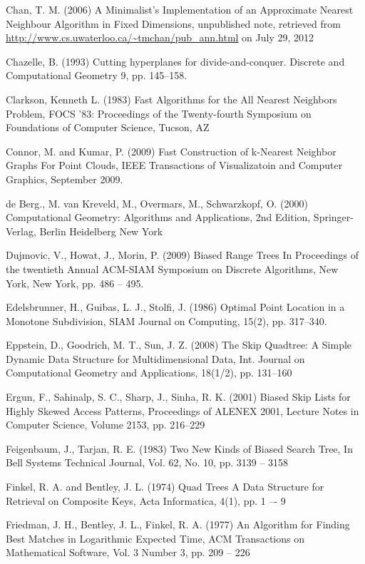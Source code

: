 \documentclass[mcs]{scsthesis}
\begin{document}
\begin{thebibliography}{5}
Chan, T. M. (2006) A Minimalist's Implementation of an Approximate Nearest
Neighbour Algorithm in Fixed Dimensions, unpublished note, retrieved from
\url{http://www.cs.uwaterloo.ca/~tmchan/pub\_ann.html} on July 29, 2012

 Chazelle, B. (1993) Cutting hyperplanes for divide-and-conquer.
Discrete and Computational Geometry 9, pp. 145--158.

Clarkson, Kenneth L. (1983) Fast Algorithms for the All Nearest Neighbors Problem,
FOCS '83: Proceedings of the Twenty-fourth Symposium on Foundations of Computer Science,
Tucson, AZ 

Connor, M. and Kumar, P. (2009) Fast Construction of k-Nearest Neighbor Graphs
For Point Clouds, IEEE Transactions of Visualizatoin and Computer Graphics,
September 2009.

de Berg., M. van Kreveld, M., Overmars, M., Schwarzkopf, O. (2000)
Computational Geometry: Algorithms and Applications, 2nd Edition, Springer-Verlag,
Berlin Heidelberg New York

Dujmovic, V., Howat, J., Morin, P. (2009) Biased Range Trees
In Proceedings of the twentieth Annual ACM-SIAM Symposium on Discrete Algorithms,
New York, New York, pp. 486 -- 495.

Edelsbrunner, H., Guibas, L. J., Stolfi, J. (1986) Optimal Point Location in a
Monotone Subdivision, SIAM Journal on Computing, 15(2), pp. 317--340. 

Eppstein, D., Goodrich, M. T., Sun, J. Z. (2008) The Skip Quadtree: A Simple
Dynamic Data Structure for Multidimensional Data, Int. Journal on Computational
Geometry and Applications, 18(1/2), pp. 131--160 

Ergun, F., Sahinalp, S. C., Sharp, J., Sinha, R. K. (2001) Biased Skip Lists
for Highly Skewed Access Patterns, Proceedings of ALENEX 2001, Lecture Notes in
Computer Science, Volume 2153, pp. 216--229 

Feigenbaum, J., Tarjan, R. E. (1983) Two New Kinds of Biased Search Tree,
In Bell Systems Technical Journal, Vol. 62, No. 10, pp. 3139 -- 3158

Finkel, R. A. and Bentley, J. L. (1974) Quad Trees A Data Structure for
Retrieval on Composite Keys, Acta Informatica, 4(1), pp. 1 –- 9 

Friedman, J. H., Bentley, J. L., Finkel, R. A. (1977) An Algorithm for Finding
Best Matches in Logarithmic Expected Time, ACM Transactions on Mathematical
Software, Vol. 3 Number 3, pp. 209 -- 226


\end{thebibliography}
\end{document}
